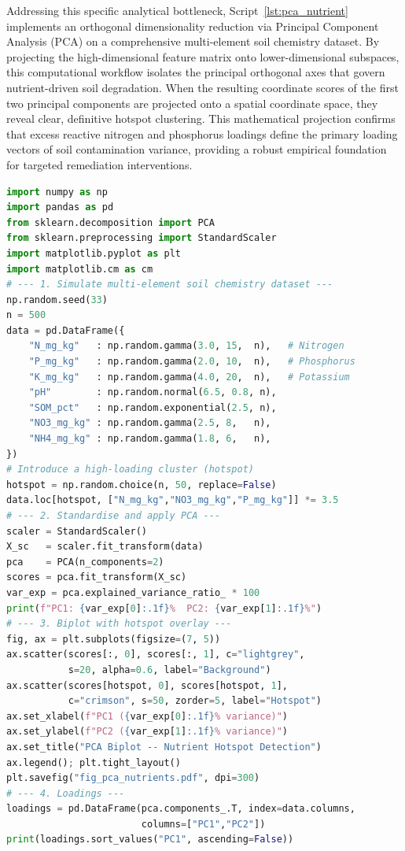 \documentclass[environments,article,submit,pdftex,moreauthors]{Definitions/mdpi}
\begin{document}
Addressing this specific analytical bottleneck, Script~\ref{lst:pca_nutrient} implements an orthogonal dimensionality reduction via Principal Component Analysis (PCA) on a comprehensive multi-element soil chemistry dataset. By projecting the high-dimensional feature matrix onto lower-dimensional subspaces, this computational workflow isolates the principal orthogonal axes that govern nutrient-driven soil degradation. When the resulting coordinate scores of the first two principal components are projected onto a spatial coordinate space, they reveal clear, definitive hotspot clustering. This mathematical projection confirms that excess reactive nitrogen and phosphorus loadings define the primary loading vectors of soil contamination variance, providing a robust empirical foundation for targeted remediation interventions.

\begin{lstlisting}[language=Python,basicstyle=\scriptsize\ttfamily,
    caption={Python workflow: PCA-based dimensionality reduction and
             nutrient hotspot identification from multi-element soil
             chemistry data (Script~5).},
    label={lst:pca_nutrient}]
import numpy as np
import pandas as pd
from sklearn.decomposition import PCA
from sklearn.preprocessing import StandardScaler
import matplotlib.pyplot as plt
import matplotlib.cm as cm
# --- 1. Simulate multi-element soil chemistry dataset ---
np.random.seed(33)
n = 500
data = pd.DataFrame({
    "N_mg_kg"   : np.random.gamma(3.0, 15,  n),   # Nitrogen
    "P_mg_kg"   : np.random.gamma(2.0, 10,  n),   # Phosphorus
    "K_mg_kg"   : np.random.gamma(4.0, 20,  n),   # Potassium
    "pH"        : np.random.normal(6.5, 0.8, n),
    "SOM_pct"   : np.random.exponential(2.5, n),
    "NO3_mg_kg" : np.random.gamma(2.5, 8,   n),
    "NH4_mg_kg" : np.random.gamma(1.8, 6,   n),
})
# Introduce a high-loading cluster (hotspot)
hotspot = np.random.choice(n, 50, replace=False)
data.loc[hotspot, ["N_mg_kg","NO3_mg_kg","P_mg_kg"]] *= 3.5
# --- 2. Standardise and apply PCA ---
scaler = StandardScaler()
X_sc   = scaler.fit_transform(data)
pca    = PCA(n_components=2)
scores = pca.fit_transform(X_sc)
var_exp = pca.explained_variance_ratio_ * 100
print(f"PC1: {var_exp[0]:.1f}%  PC2: {var_exp[1]:.1f}%")
# --- 3. Biplot with hotspot overlay ---
fig, ax = plt.subplots(figsize=(7, 5))
ax.scatter(scores[:, 0], scores[:, 1], c="lightgrey",
           s=20, alpha=0.6, label="Background")
ax.scatter(scores[hotspot, 0], scores[hotspot, 1],
           c="crimson", s=50, zorder=5, label="Hotspot")
ax.set_xlabel(f"PC1 ({var_exp[0]:.1f}% variance)")
ax.set_ylabel(f"PC2 ({var_exp[1]:.1f}% variance)")
ax.set_title("PCA Biplot -- Nutrient Hotspot Detection")
ax.legend(); plt.tight_layout()
plt.savefig("fig_pca_nutrients.pdf", dpi=300)
# --- 4. Loadings ---
loadings = pd.DataFrame(pca.components_.T, index=data.columns,
                        columns=["PC1","PC2"])
print(loadings.sort_values("PC1", ascending=False))
\end{lstlisting}
\end{document}

